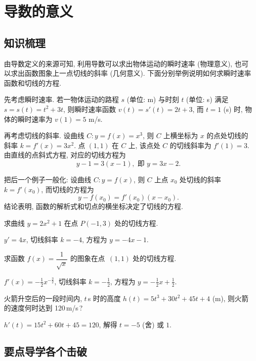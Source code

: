   \section{导数的意义}
  
  \subsection{知识梳理}
  由导数定义的来源可知, 利用导数可以求出物体运动的瞬时速率 (物理意义), 
  也可以求出函数图象上一点切线的斜率 (几何意义). 
  下面分别举例说明如何求瞬时速率函数和切线的方程.
  
  先考虑瞬时速率. 若一物体运动的路程 $s$ (单位: m) 与时刻 $t$ (单位: s) 满足 $s=s(t)=t^2 +3t$, 则瞬时速率函数 $v(t)= s'(t)= 2t+3$, 
  而 $t=1$ (s) 时, 物体的瞬时速率为 $v(1)=5$ m/s.
  
  再考虑切线的斜率. 设曲线 $C\colon y=f(x)=x^3$, 
  则 $C$ 上横坐标为 $x$ 的点处切线的斜率 $k=f'(x)=3x^2$.
  点 $(1,1)$ 在 $C$ 上, 该点处 $C$ 的切线斜率为 $f'(1)= 3$.
  由直线的点斜式方程, 对应的切线方程为 
  \[y-1=3(x-1), \text{\ 即\ }y=3x-2.\]
  
  把后一个例子一般化: 设曲线 $C\colon y=f(x)$, 
  则 $C$ 上点 $x_0$ 处切线的斜率 $k=f'(x_0)$, 而切线的方程为 
  \[y-f(x_0)= f'(x_0)(x-x_0).\]
  结论表明, 函数的解析式和切点的横坐标决定了切线的方程.

  \lianxi
  \begin{exercise}
    求曲线 $y=2x^2 +1$ 在点 $P(-1,3)$ 处的切线方程.
  \end{exercise}

  \beginsolution
    $y'=4x$, 切线斜率 $k=-4$, 方程为 $y=-4x-1$.
  \endsolution
  
  \begin{exercise}
    求函数 $f(x)=\dfrac1{\sqrt{x}}$ 的图象在点~$(1,1)$ 处的切线方程.
  \end{exercise}

  \beginsolution
    $f'(x)=-\frac12x^{-\frac32}$, 切线斜率 $k=-\frac12$, 方程为 $y=-\frac12x+\frac12$.
  \endsolution
    
  \begin{exercise}
    火箭升空后的一段时间内, $t$\,s 时的高度 $h(t)=5t^3 +30t^2 +45t+4$ (m), 
    则火箭的速度何时达到 120\,m/s\,?
  \end{exercise}

  \beginsolution
    $h'(t)=15t^2+60t+45=120$, 解得 $t=-5$ (舍) 或 $1$.
  \endsolution
  
  \subsection{要点导学\quad 各个击破}

